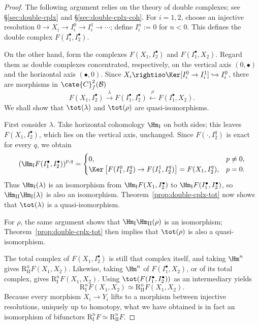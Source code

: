 \begin{proof}
The following argument relies on the theory of double complexes; see
\S\ref{sec:double-cplx} and \S\ref{sec:double-cplx-coh}. For $i=1,2$, choose
an injective resolution
$0\to X_i\to I_i^0\to I_i^1\to\cdots$; define $I_i^n:=0$ for $n<0$.
This defines the double complex $F(I_1^\bullet,I_2^\bullet)$.

On the other hand, form the complexes $F(X_1,I_2^\bullet)$ and
$F(I_1^\bullet,X_2)$. Regard them as double complexes concentrated,
respectively, on the vertical axis $(0,\bullet)$ and the horizontal axis
$(\bullet,0)$. Since
$X_i\rightiso\Ker[I_i^0\to I_i^1]\hookrightarrow I_i^0$, there are morphisms
in $\cate{C}^2_f(\mathcal{B})$
\[
F(X_1,I_2^\bullet)\xrightarrow{\lambda}
F(I_1^\bullet,I_2^\bullet)\xleftarrow{\rho}
F(I_1^\bullet,X_2).
\]
We shall show that $\tot(\lambda)$ and $\tot(\rho)$ are quasi-isomorphisms.

First consider $\lambda$. Take horizontal cohomology $\Hm_{\mathrm{I}}$ on
both sides; this leaves $F(X_1,I_2^\bullet)$, which lies on the vertical
axis, unchanged. Since $F(\cdot,I_2^q)$ is exact for every $q$, we obtain
\[
\left(\Hm_{\mathrm{I}}F(I_1^\bullet,I_2^\bullet)\right)^{p,q}
=\begin{cases}
0,&p\neq0,\\
\Ker\left[F(I_1^0,I_2^q)\to F(I_1^1,I_2^q)\right]
=F(X_1,I_2^q),&p=0.
\end{cases}
\]
Thus $\Hm_{\mathrm{I}}(\lambda)$ is an isomorphism from
$\Hm_{\mathrm{I}}F(X_1,I_2^\bullet)$ to
$\Hm_{\mathrm{I}}F(I_1^\bullet,I_2^\bullet)$, so
$\Hm_{\mathrm{II}}\Hm_{\mathrm{I}}(\lambda)$ is also an isomorphism.
Theorem~\ref{prop:double-cplx-tot} now shows that $\tot(\lambda)$ is a
quasi-isomorphism.

For $\rho$, the same argument shows that
$\Hm_{\mathrm{I}}\Hm_{\mathrm{II}}(\rho)$ is an isomorphism;
Theorem~\ref{prop:double-cplx-tot} then implies that $\tot(\rho)$ is also a
quasi-isomorphism.

The total complex of $F(X_1,I_2^\bullet)$ is still that complex itself, and
taking $\Hm^n$ gives $\mathrm{R}_{\mathrm{II}}^nF(X_1,X_2)$. Likewise,
taking $\Hm^n$ of $F(I_1^\bullet,X_2)$, or of its total complex, gives
$\mathrm{R}_{\mathrm{I}}^nF(X_1,X_2)$. Using
$\tot(F(I_1^\bullet,I_2^\bullet))$ as an intermediary yields
\[
\mathrm{R}_{\mathrm{I}}^nF(X_1,X_2)\simeq
\mathrm{R}_{\mathrm{II}}^nF(X_1,X_2).
\]
Because every morphism $X_i\to Y_i$ lifts to a morphism between injective
resolutions, uniquely up to homotopy, what we have obtained is in fact an
isomorphism of bifunctors
$\mathrm{R}_{\mathrm{I}}^nF\simeq\mathrm{R}_{\mathrm{II}}^nF$.
\end{proof}

